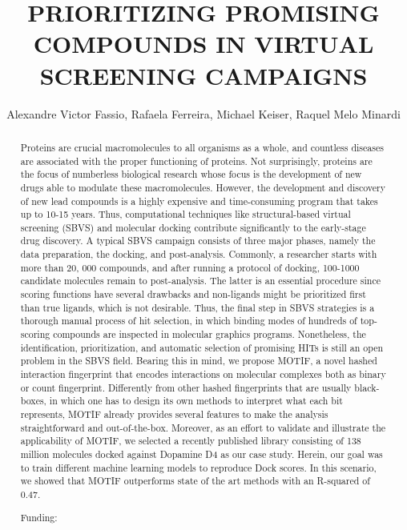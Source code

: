 \documentclass[twoside]{article}
\title{\vspace{-15mm}\fontsize{24pt}{10pt}\selectfont\textbf{ PRIORITIZING PROMISING COMPOUNDS IN VIRTUAL SCREENING CAMPAIGNS }} %
\author{ Alexandre Victor Fassio, Rafaela Ferreira, Michael Keiser, Raquel Melo Minardi }
\affil{ Universidade Federal de Minas Gerais,  UFMG }
\date{}
\begin{document}
  
  
  \maketitle %
  
  
  \thispagestyle{fancy} %
  
  
  \begin{abstract}
  Proteins are crucial macromolecules to all organisms as a whole,  and countless diseases are associated with the proper functioning of proteins. Not surprisingly,  proteins are the focus of numberless biological research whose focus is the development of new drugs able to modulate these macromolecules. However,  the development and discovery of new lead compounds is a highly expensive and time-consuming program that takes up to 10-15 years. Thus,  computational techniques like structural-based virtual screening (SBVS) and molecular docking contribute significantly to the early-stage drug discovery. A typical SBVS campaign consists of three major phases,  namely the data preparation,  the docking,  and post-analysis. Commonly,  a researcher starts with more than 20, 000 compounds,  and after running a protocol of docking,  100-1000 candidate molecules remain to post-analysis. The latter is an essential procedure since scoring functions have several drawbacks and non-ligands might be prioritized first than true ligands,  which is not desirable. Thus,  the final step in SBVS strategies is a thorough manual process of hit selection,  in which binding modes of hundreds of top-scoring compounds are inspected in molecular graphics programs. Nonetheless,  the identification,  prioritization,  and automatic selection of promising HITs is still an open problem in the SBVS field. Bearing this in mind,  we propose MOTIF,  a novel hashed interaction fingerprint that encodes interactions on molecular complexes both as binary or count fingerprint. Differently from other hashed fingerprints that are usually black-boxes,  in which one has to design its own methods to interpret what each bit represents,   MOTIF already provides several features to make the analysis straightforward and out-of-the-box. Moreover,  as an effort to validate and illustrate the applicability of MOTIF,  we selected a recently published library consisting of 138 million molecules docked against Dopamine D4 as our case study. Herein,  our goal was to train different machine learning models to reproduce Dock scores. In this scenario,  we showed that MOTIF outperforms state of the art methods with an R-squared of 0.47.
  
  Funding:  \\ 
  \end{abstract}
  
\end{document}
